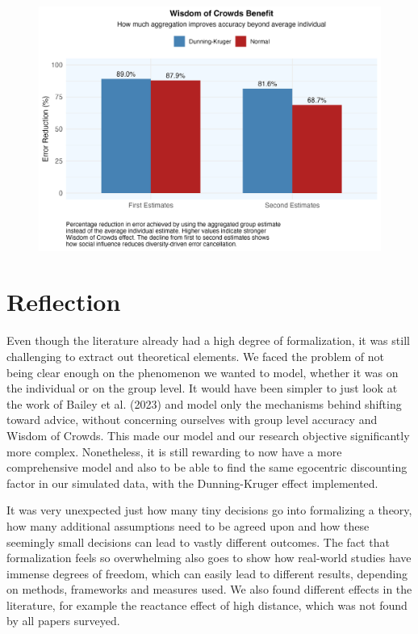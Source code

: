 \documentclass[
  man,floatsintext]{apa6}
\begin{document}
\begin{figure}[H]
\includegraphics[width=7in]{photos/woc_effect} \caption{ }\label{fig:unnamed-chunk-7}
\end{figure}

\hypertarget{reflection}{%
\section{Reflection}\label{reflection}}

Even though the literature already had a high degree of formalization, it was still challenging to extract out theoretical elements. We faced the problem of not being clear enough on the phenomenon we wanted to model, whether it was on the individual or on the group level. It would have been simpler to just look at the work of Bailey et al. (2023) and model only the mechanisms behind shifting toward advice, without concerning ourselves with group level accuracy and Wisdom of Crowds. This made our model and our research objective significantly more complex. Nonetheless, it is still rewarding to now have a more comprehensive model and also to be able to find the same egocentric discounting factor in our simulated data, with the Dunning-Kruger effect implemented.

It was very unexpected just how many tiny decisions go into formalizing a theory, how many additional assumptions need to be agreed upon and how these seemingly small decisions can lead to vastly different outcomes. The fact that formalization feels so overwhelming also goes to show how real-world studies have immense degrees of freedom, which can easily lead to different results, depending on methods, frameworks and measures used. We also found different effects in the literature, for example the reactance effect of high distance, which was not found by all papers surveyed.
\end{document}
